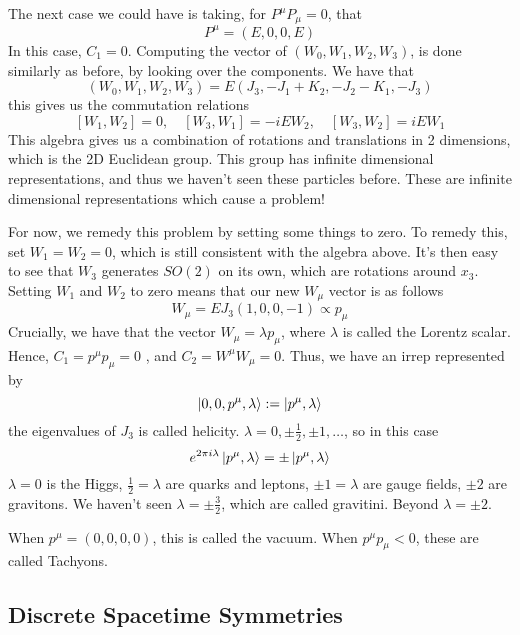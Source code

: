 \documentclass[11pt, oneside]{article}   	%
\theoremstyle{slanted}
\begin{document}
The next case we could have 
is taking, for $ P ^ \mu P _ \mu  =0   $, 
that 
\[
 P ^ \mu  = \left( E , 0 , 0 , E  \right)
\] In this case, $ C _  1 =0 $. 
Computing the vector of $ \left( W_ 0 , W _1 , W _ 2, W_  3  \right)  $,
is done similarly as before, by 
looking over the components. 
We have that 
\[
	\left( W_0, W_1 , W_2, W_3  \right)   = E \left( 
	J _ 3,  - J _1 + K _ 2 ,  - J _ 2  -  K_ 1 ,  -J _ 3 \right) 
\] this gives us the commutation 
relations 
\[
 \left[  W_1 , W _ 2   \right]  =0 , \quad \left[  W _ 3,  W_ 1  \right]  
  =  - i E W _2 , \quad \left[  W _ 3, W _ 2  \right]   = i E W_ 1 
\] This algebra gives us a combination 
of rotations and translations in 2 dimensions, 
which is the 2D Euclidean group. 
This group has
infinite dimensional representations, and thus 
we haven't seen these particles 
before. These are infinite dimensional representations 
which cause a problem! 

For now, we remedy this 
problem by setting some things to zero. 
To remedy this, set $ W_ 1  = W_ 2 = 0 $, which 
is still consistent with the algebra above. 
It's then easy to see that 
$ W _ 3   $ generates $ SO ( 2 ) $ on its 
own, which are rotations around $ x _ 3 $. 
Setting $ W_1 $ and $ W_2 $ to zero 
means that our new $ W _ \mu $ vector is 
as follows 
\[
 W_ \mu  = E J _ 3 \left( 1, 0 , 0 , - 1   \right)  \propto p _ \mu 
\] Crucially, 
we have that the vector $ W _ \mu = \lambda p _ \mu $, 
where $ \lambda $ is called the Lorentz scalar. Hence, $ C _ 1 = p ^ \mu p _ \mu  =  0$ , 
and $ C _ 2  =  W^ \mu W _ \mu  = 0 $. 
Thus, we have an irrep represented by 
\[
 \ket{ 0 , 0 , p ^ \mu , \lambda } : = \ket{ p ^ \mu , \lambda } 
\] the eigenvalues of $ J _  3 $ is called helicity. 
$ \lambda  = 0 , \pm \frac{1}{2 } , \pm 1 , \dots $, 
so in this case
\[
 e ^{  2 \pi i \lambda  } \ket{ p ^ \mu , \lambda }  = \pm \ket{ p^ \mu , \lambda } 
\] $ \lambda  = 0 $ is the Higgs, 
$ \frac{1}{2 }  = \lambda $ are quarks and leptons, 
$ \pm 1  = \lambda $ are gauge fields, 
$ \pm  2  $ are gravitons. 
We haven't seen $ \lambda  = \pm \frac{3}{2 } $, 
which are called gravitini. 
Beyond $ \lambda  = \pm 2 $. 

When $ p ^ \mu  = \left( 0 , 0 , 0 , 0  \right)  $, 
this is called the vacuum. When $ p ^ \mu p _ \mu < 0  $, 
these are called Tachyons. 

\subsection{Discrete Spacetime Symmetries}
\end{document}
